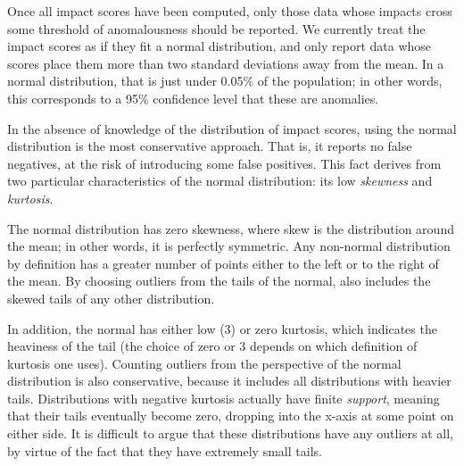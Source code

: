 Once all impact scores have been computed, only those data whose
impacts cross some threshold of anomalousness should be
reported. We currently treat the impact scores as if they fit a normal
distribution, and only report data whose scores place them more
than two standard deviations away from the mean. In a normal
distribution, that is just under 0.05\% of the population; in other
words, this corresponds to a 95\% confidence level that these are
anomalies.

In the absence of knowledge of the distribution of impact scores, using
the normal distribution is the most conservative approach. That is, it
reports no false negatives, at the risk of introducing some false
positives. This fact derives from two particular characteristics of the
normal distribution: its low \emph{skewness} and \emph{kurtosis}.

The normal distribution has zero skewness, where skew is the
distribution around the mean; in other words, it is perfectly
symmetric. Any non-normal distribution by definition has a greater
number of points either to the left or to the right of the mean. By
choosing outliers from the tails of the normal, \checkcell{} also
includes the skewed tails of any other distribution.

In addition, the normal has either low (3) or zero kurtosis, which
indicates the heaviness of the tail (the choice of zero or 3 depends
on which definition of kurtosis one uses). Counting outliers from the
perspective of the normal distribution is also conservative, because
it includes all distributions with heavier tails. Distributions with
negative kurtosis actually have finite \emph{support}, meaning that
their tails eventually become zero, dropping into the x-axis at some
point on either side. It is difficult to argue that these
distributions have any outliers at all, by virtue of the fact that
they have extremely small tails.

